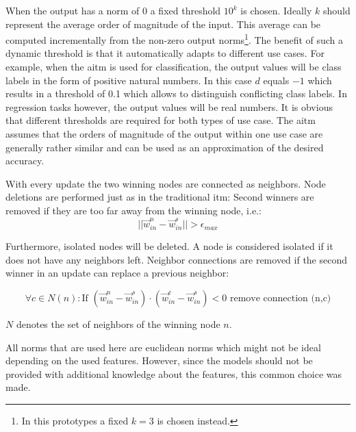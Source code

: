 When the output has a norm of $0$ a fixed threshold $10^k$ is chosen. Ideally $k$ should represent the average order of magnitude of the input. This average can be computed incrementally from the non-zero output norms\footnote{In this prototypes a fixed $k=3$ is chosen instead.}. The benefit of such a dynamic threshold is that it automatically adapts to different use cases. For example, when the \gls{aitm} is used for classification, the output values will be class labels in the form of positive natural numbers. In this case $d$ equals $-1$ which results in a threshold of 0.1 which allows to distinguish conflicting class labels.
In regression tasks however, the output values will be real numbers. It is obvious that different thresholds are required for both types of use case. The \gls{aitm} assumes that the orders of magnitude of the output within one use case are generally rather similar and can be used as an approximation of the desired accuracy.

With every update the two winning nodes are connected as neighbors. Node deletions are performed just as in the traditional \gls{itm}: Second winners are removed if they are too far away from the winning node, i.e.:
\begin{equation}
||\vec{w}^n_{in} - \vec{w}^s_{in}|| > \epsilon_{max}
\end{equation}

Furthermore, isolated nodes will be deleted. A node is considered isolated if it does not have any neighbors left. Neighbor connections are removed if the second winner in an update can replace a previous neighbor:

\begin{equation}
\forall c \in N(n): \text{If~} (\vec{w}^n_{in}-\vec{w}^s_{in}) \cdot (\vec{w}^c_{in}-\vec{w}^s_{in}) < 0 \text{~remove connection (n,c)}
\end{equation}

$N$ denotes the set of neighbors of the winning node $n$.

All norms that are used here are euclidean norms which might not be ideal depending on the used features. However, since the models should not be provided with additional knowledge about the features, this common choice was made.

